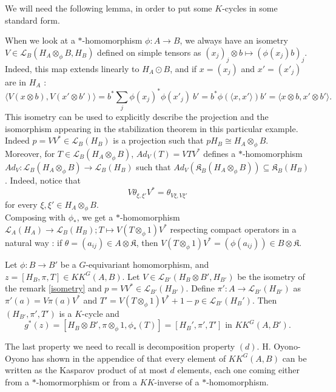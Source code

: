 We will need the following lemma, in order to put some $K$-cycles in some standard form.

\begin{rk}\label{isometry}
When we look at a $*$-homomorphism $\phi : A\rightarrow B$, we always have an isometry $V\in \mathcal L_B ( H_A\otimes_\phi B , H_B)$ defined on simple tensors as $(x_j)_j\otimes b \mapsto (\phi(x_j)b)_j$. Indeed, this map extends linearly to $H_A \odot B$, and if $x = (x_j)$ and $x'=(x'_j)$ are in $H_A$ : 
\[\langle V (x\otimes b) , V(x'\otimes b')\rangle = b^* \sum_j \phi(x_j)^* \phi(x'_j) \  b' = b^*\phi(\langle x, x' \rangle)b' = \langle x\otimes b , x'\otimes b' \rangle . \] %
This isometry can be used to explicitly describe the projection and the isomorphism appearing in the stabilization theorem in this particular example. Indeed $p = VV^*\in\mathcal L_B(H_B)$ is a projection such that $p H_B \cong H_A\otimes_\phi B $.\\

Moreover, for $T\in \mathcal L_B(H_A\otimes_\phi B)$, $Ad_V(T) = VTV^*$ defines a $*$-homomorphism $Ad_V : \mathcal L_B(H_A\otimes_\phi B)\rightarrow \mathcal L_B(H_B)$ such that $Ad_V(\mathfrak K_B(H_A\otimes_\phi B))\subseteq \mathfrak K_B(H_B)$. Indeed, notice that 
\[V\theta_{\xi,\xi'}V^* = \theta_{V\xi,V\xi'}\]
for every $\xi,\xi'\in H_A\otimes_\phi B$.\\

Composing with $\phi_*$, we get a $*$-homomorphism $\mathcal L_A(H_A)\rightarrow \mathcal L_B(H_B); T\mapsto V(T\otimes_\phi 1)V^*$ respecting compact operators in a natural way : if $\theta = (a_{ij})\in A\otimes\mathfrak K$, then $V(T\otimes_\phi 1)V^* = (\phi(a_{ij}))\in B\otimes\mathfrak K$.  
\end{rk}

\begin{lem}\label{isometryKK}
Let $\phi : B\rightarrow B'$ be a $G$-equivariant homomorphism, and $z=[H_B,\pi, T]\in KK^G(A,B)$. Let $V\in\mathcal L_{B'}(H_B\otimes B', H_{B'})$ be the isometry of the remark \ref{isometry} and $p = VV^*\in\mathcal L_{B'}(H_{B'})$. Define $\pi' : A\rightarrow \mathcal L_{B'}(H_{B'})$ as $\pi'(a) = V\pi(a)V^*$ and $T'= V(T\otimes_\phi 1)V^* + 1-p \in \mathcal L_{B'}(H_B')$. Then $(H_{B'},\pi',T')$ is a $K$-cycle and 
\[g^*(z) = [H_B\otimes B',\pi\otimes_\phi 1,\phi_*(T)]=[H_B', \pi', T']\text{ in } KK^G(A,B').\]
\end{lem} 

The last property we need to recall is decomposition property $(d)$. H. Oyono-Oyono has shown in the appendice of \cite{LaffOY} that every element of $KK^G(A,B)$ can be written as the Kasparov product of at most $d$ elements, each one coming either from a $*$-homormorphism or from a $KK$-inverse of a $*$-homomorphism.\\

